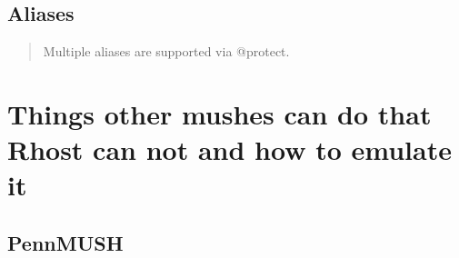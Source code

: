 \documentclass[letterpaper,10pt,english]{sphinxmanual}
\begin{document}
\subsection{Aliases}
\label{\detokenize{differences:aliases}}\begin{quote}

\sphinxAtStartPar
Multiple aliases are supported via @protect.
\end{quote}


\section{Things other mushes can do that Rhost can not and how to emulate it}
\label{\detokenize{differences:things-other-mushes-can-do-that-rhost-can-not-and-how-to-emulate-it}}

\subsection{PennMUSH}
\end{document}
